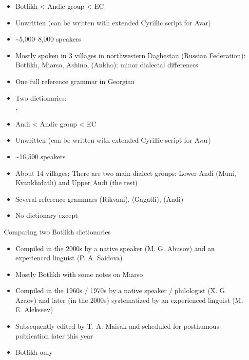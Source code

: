 \documentclass[13pt, t]{beamer}
\begin{document}
\begin{frame}
\begin{multicols}{2}
\begin{itemize}
    \item Botlikh < Andic group < EC
    \item Unwritten (can be written with extended Cyrillic script for Avar)
    \item \textasciitilde{}5,000--8,000 speakers
    \item Mostly spoken in 3 villages in northwestern Daghestan (Russian Federation): Botlikh, Miarso, Ashino, (Ankho); minor dialectal differences
    \item One full reference grammar in Georgian  \citep{gudava1962}
    \item Two dictionaries: \\
    \citep{saidovaabusov2012}, \citep{alekseev2019}
\end{itemize}
\vfill
\columnbreak
\begin{itemize}
    \item Andi < Andic group < EC
    \item Unwritten (can be written with extended Cyrillic script for Avar)
    \item \textasciitilde{}16,500 speakers
    \item About 14 villages; There are two main dialect groups: Lower Andi (Muni, Kvankhidatli) and Upper Andi (the rest)
    \item Several reference grammars \citep{suleymanov57} (Rikvani), \citep{salimov10} (Gagatli), \citep{tsertsvadze65} (Andi)
    \item No dictionary except\\ \citep{kibrik1988}
\end{itemize}
\end{multicols}
\end{frame}

\begin{frame}{Comparing two Botlikh dictionaries}

\begin{block}{\citep{saidovaabusov2012}}
    \begin{itemize}
        \item Compiled in the 2000s by a native speaker (M. G. Abusov) and an experienced linguist (P. A. Saidova)
        \item Mostly Botlikh with some notes on Miarso
    \end{itemize}
\end{block}
\pause
\begin{block}{\citep{alekseev2019}}
    \begin{itemize}
        \item Compiled in the 1960s / 1970s by a native speaker / philologist (X. G. Azaev) and later (in the 2000s) systematized by an experienced linguist (M. E. Alekseev)
        \item Subsequently edited by T. A. Maisak and scheduled for posthumous publication later this year
        \item Botlikh only 
    \end{itemize}
\end{block}
\end{frame}
\end{document}

